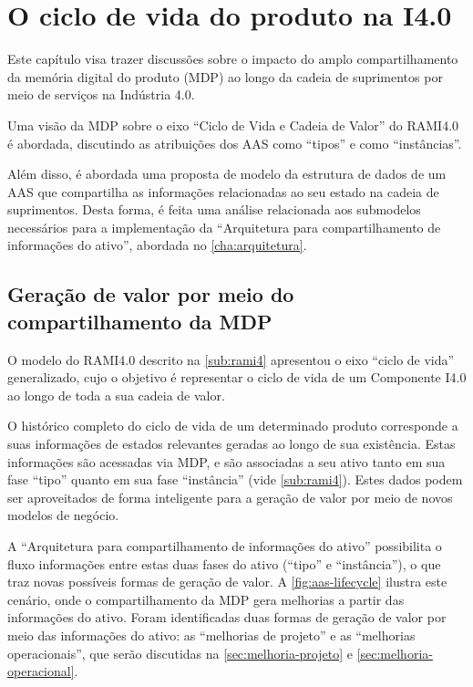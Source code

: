 \chapter{O ciclo de vida do produto na I4.0}
\label{cha:ciclo-de-vida}

Este capítulo visa trazer discussões sobre o impacto do amplo compartilhamento da memória digital do produto (MDP) ao longo da cadeia de suprimentos por meio de serviços na Indústria 4.0.


Uma visão da MDP sobre o eixo ``Ciclo de Vida e Cadeia de Valor'' do RAMI4.0 é abordada, discutindo as atribuições dos AAS como ``tipos'' e como ``instâncias''.

Além disso, é abordada uma proposta de modelo da estrutura de dados de um AAS que compartilha as informações relacionadas ao seu estado na cadeia de suprimentos. Desta forma, é feita uma análise relacionada aos submodelos necessários para a implementação da ``Arquitetura para compartilhamento de informações do ativo'', abordada no \autoref{cha:arquitetura}.

\section{Geração de valor por meio do compartilhamento da MDP}

O modelo do RAMI4.0 descrito na \autoref{sub:rami4} apresentou o eixo ``ciclo de vida'' generalizado, cujo o objetivo é representar o ciclo de vida de um Componente I4.0 ao longo de toda a sua cadeia de valor.

O histórico completo do ciclo de vida de um determinado produto corresponde a suas informações de estados relevantes geradas ao longo de sua existência. Estas informações são acessadas via MDP, e são associadas a seu ativo tanto em sua fase ``tipo'' quanto em sua fase ``instância'' (vide \autoref{sub:rami4}). Estes dados podem ser aproveitados de forma inteligente para a geração de valor por meio de novos modelos de negócio.

A ``Arquitetura para compartilhamento de informações do ativo'' possibilita o fluxo informações entre estas duas fases do ativo (``tipo'' e ``instância''), o que traz novas possíveis formas de geração de valor. A \autoref{fig:aas-lifecycle} ilustra este cenário, onde o compartilhamento da MDP gera melhorias a partir das informações do ativo. Foram identificadas duas formas de geração de valor por meio das informações do ativo: as ``melhorias de projeto'' e as ``melhorias operacionais'', que serão discutidas na \autoref{sec:melhoria-projeto} e \autoref{sec:melhoria-operacional}.

